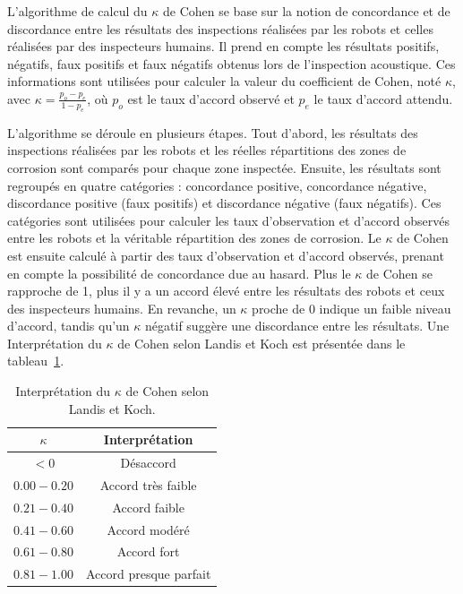 \documentclass[francais,RandD]{rapportPFE}
\begin{document}
			L'algorithme de calcul du $\kappa$ de Cohen se base sur la notion de concordance et de discordance entre les résultats des inspections réalisées par les robots et celles réalisées par des inspecteurs humains.
			Il prend en compte les résultats positifs, négatifs, faux positifs et faux négatifs obtenus lors de l'inspection acoustique.
			Ces informations sont utilisées pour calculer la valeur du coefficient de Cohen, noté $\kappa$, avec $\kappa = \frac{p_o - p_e}{1 - p_e}$, où $p_o$ est le taux d'accord observé et $p_e$ le taux d'accord attendu.

			L'algorithme se déroule en plusieurs étapes.
			Tout d'abord, les résultats des inspections réalisées par les robots et les réelles répartitions des zones de corrosion sont comparés pour chaque zone inspectée.
			Ensuite, les résultats sont regroupés en quatre catégories : concordance positive, concordance négative, discordance positive (faux positifs) et discordance négative (faux négatifs).
			Ces catégories sont utilisées pour calculer les taux d'observation et d'accord observés entre les robots et la véritable répartition des zones de corrosion.
			Le $\kappa$ de Cohen est ensuite calculé à partir des taux d'observation et d'accord observés, prenant en compte la possibilité de concordance due au hasard.
			Plus le $\kappa$ de Cohen se rapproche de 1, plus il y a un accord élevé entre les résultats des robots et ceux des inspecteurs humains.
			En revanche, un $\kappa$ proche de 0 indique un faible niveau d'accord, tandis qu'un $\kappa$ négatif suggère une discordance entre les résultats.
			Une Interprétation du $\kappa$ de Cohen selon Landis et Koch est présentée dans le tableau~\ref{tab:Kappa_Cohen}.

			\begin{table}[h!]
				\centering
				\begin{tabular}{|c|c|}
					\hline
					$\kappa$ & Interprétation \\
					\hline
					$< 0$ & Désaccord \\
					\hline
					$0.00 - 0.20$ & Accord très faible \\
					\hline
					$0.21 - 0.40$ & Accord faible \\
					\hline
					$0.41 - 0.60$ & Accord modéré \\
					\hline
					$0.61 - 0.80$ & Accord fort \\
					\hline
					$0.81 - 1.00$ & Accord presque parfait \\
					\hline
				\end{tabular}
				\caption{Interprétation du $\kappa$ de Cohen selon Landis et Koch.}
				\label{tab:Kappa_Cohen}
			\end{table}
\end{document}
